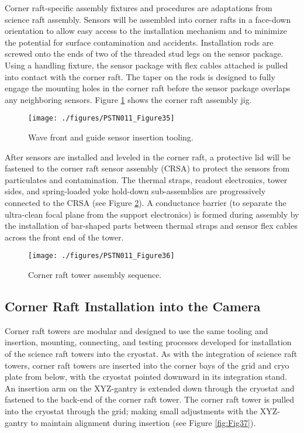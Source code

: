 Corner raft-specific assembly fixtures and procedures are adaptations from science raft assembly.
Sensors will be assembled into corner rafts in a face-down orientation to allow easy access to the
installation mechanism and to minimize the potential for surface contamination and accidents.
Installation rods are screwed onto the ends of two of the threaded stud legs on the sensor package.
Using a handling fixture, the sensor package with flex cables attached is pulled into contact with the
corner raft. The taper on the rods is designed to fully engage the mounting holes in the corner raft
before the sensor package overlaps any neighboring sensors. Figure \ref{fig:Fig35} shows the 
corner raft assembly jig. 

\begin{figure}[htbp]
\begin{center}
\texttt{[image: ./figures/PSTN011\_Figure35]}
\caption{Wave front and guide sensor insertion tooling.}
\label{fig:Fig35}
\end{center}
\end{figure}

After sensors are installed and leveled in the corner raft, a protective lid will be fastened to the corner
raft sensor assembly (CRSA) to protect the sensors from particulates and contamination. The thermal
straps, readout electronics, tower sides, and spring-loaded yoke hold-down sub-assemblies are
progressively connected to the CRSA (see Figure \ref{fig:Fig36}). A conductance barrier (to separate the ultra-clean
focal plane from the support electronics) is formed during assembly by the installation of bar-shaped
parts between thermal straps and sensor flex cables across the front end of the tower.

\begin{figure}[htbp]
\begin{center}
\texttt{[image: ./figures/PSTN011\_Figure36]}
\caption{Corner raft tower assembly sequence.}
\label{fig:Fig36}
\end{center}
\end{figure}

\subsection{Corner Raft Installation into the Camera}

Corner raft towers are modular and designed to use the same tooling and insertion, mounting,
connecting, and testing processes developed for installation of the science raft towers into the cryostat.
As with the integration of science raft towers, corner raft towers are inserted into the corner bays of the
grid and cryo plate from below, with the cryostat pointed downward in its integration stand. An
insertion arm on the XYZ-gantry is extended down through the cryostat and fastened to the back-end of
the corner raft tower. The corner raft tower is pulled into the cryostat through the grid; making small
adjustments with the XYZ-gantry to maintain alignment during insertion (see Figure \ref{fig:Fig37}).

